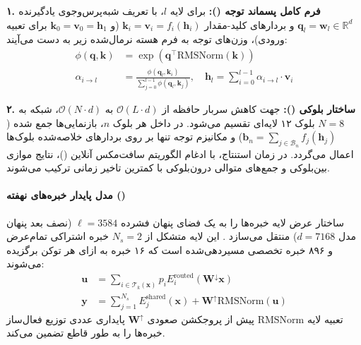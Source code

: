 \textbf{۱. فرم کامل پسماند توجه ():}
برای لایه $l$، با تعریف شبه‌پرس‌وجوی یادگیرنده $\mathbf{q}_l = \mathbf{w}_l \in \mathbb{R}^d$ و بردارهای کلید-مقدار $\mathbf{k}_i = \mathbf{v}_i = f_i(\mathbf{h}_i)$ (و $\mathbf{k}_0 = \mathbf{v}_0 = \mathbf{h}_1$ برای تعبیه ورودی)، وزن‌های توجه به فرم هسته نرمال‌شده زیر به دست می‌آیند:
\begin{align}
    \phi(\mathbf{q}, \mathbf{k}) &= \exp\left(\mathbf{q}^\top \text{RMSNorm}(\mathbf{k})\right) \\
    \alpha_{i \to l} &= \frac{\phi(\mathbf{q}_l, \mathbf{k}_i)}{\sum_{j=0}^{l-1} \phi(\mathbf{q}_l, \mathbf{k}_j)}, \quad \mathbf{h}_l = \sum_{i=0}^{l-1} \alpha_{i \to l} \cdot \mathbf{v}_i
\end{align}

\textbf{۲. ساختار بلوکی ():}
جهت کاهش سربار حافظه از $\mathcal{O}(L \cdot d)$ به $\mathcal{O}(N \cdot d)$، شبکه به $N=8$ بلوک ۱۲ لایه‌ای تقسیم می‌شود. در داخل هر بلوک $n$، بازنمایی‌ها جمع شده ($\mathbf{b}_n = \sum_{j \in \mathcal{B}_n} f_j(\mathbf{h}_j)$) و مکانیزم توجه تنها بر روی بردارهای خلاصه‌شده بلوک‌ها اعمال می‌گردد. در زمان استنتاج، با ادغام الگوریتم سافت‌مکس آنلاین ()، نتایج موازی بین‌بلوکی و جمع‌های متوالی درون‌بلوکی با کمترین تاخیر زمانی ترکیب می‌شوند.

\paragraph*{مدل پایدار خبره‌های نهفته ()}
ساختار  عرض لایه خبره‌ها را به یک فضای پنهان فشرده $\ell = 3584$ (نصف بعد پنهان مدل $d=7168$) منتقل می‌سازد \cite{elango2026latentmoe}. این لایه متشکل از $N_s = 2$ خبره اشتراکی تمام‌عرض و ۸۹۶ خبره تخصصی مسیردهی‌شده است که ۱۶ خبره به ازای هر توکن برگزیده می‌شوند:
\begin{align}
    \mathbf{u} &= \sum_{i \in \mathcal{T}_k(\mathbf{x})} p_i E_i^{\text{routed}}\left(\mathbf{W}^\downarrow \mathbf{x}\right) \\
    \mathbf{y} &= \sum_{j=1}^{N_s} E_j^{\text{shared}}(\mathbf{x}) + \mathbf{W}^\uparrow \text{RMSNorm}(\mathbf{u})
\end{align}
تعبیه لایه $\text{RMSNorm}$ پیش از پروجکشن صعودی $\mathbf{W}^\uparrow$ پایداری عددی توزیع فعال‌ساز خبره‌ها را به طور قاطع تضمین می‌کند.

